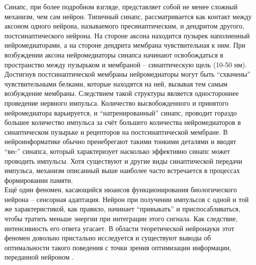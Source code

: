 \documentclass[a4paper,10pt]{article}
\begin{document}
\indent Синапс, при более подробном взгляде, представляет собой не менее сложный механизм, чем сам нейрон. Типичный синапс, рассматривается как контакт между аксоном одного нейрона, называемого пресинаптическим, и дендритом другого, постсинаптического нейрона. На стороне аксона находится пузырек наполненный нейромедиаторами, а на стороне дендрита мембрана чувствительная к ним. При возбуждении аксона нейромедиаторы синапса начинают освобождаться в пространство между пузырьком и мембраной -- синаптическую щель (10-50 нм). Достигнув постсинаптической мембраны нейромедиаторы могут быть ``схвачены'' чувствительными белками, которые находятся на ней, вызывая тем самым возбуждение мембраны. Следствием такой структуры является одностороннее проведение нервного импульса. Количество высвобожденного и принятого нейромедиатора варьируется, и ``натренированный'' синапс, проводит гораздо большее количество импульса за счёт большего количества нейромедиаторов в синаптическом пузырьке и рецепторов на постсинаптической мембране. В нейроинформатике обычно пренебрегают такими тонкими деталями и вводят ``веc'' синапса, который характеризует насколько эффективно синапс может проводить импульсы. Хотя существуют и другие виды синаптической передачи импульса, механизм описанный выше наиболее часто встречается в процессах формировании памяти.\\
\indent Ещё один феномен, касающийся нюансов функционирования биологического нейрона -- сенсорная адаптация\cite{Phizi}. Нейрон при получении импульсов с одной и той же характеристикой, как правило, начинает ``привыкать'' и приспосабливаться, чтобы тратить меньше энергии при интеграции этого сигнала. Как следствие, интенсивность его ответа угасает. В области теоретической нейронауки этот феномен довольно пристально исследуется и существуют выводы об оптимальности такого поведения с точки зрения оптимизации информации, переданной нейроном \cite{Adapt,TripleAdapt}.
\end{document}
